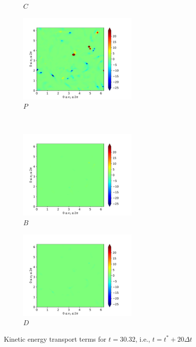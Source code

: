\begin{figure}[H]
\begin{subfigure}{0.45\textwidth}
        \caption{$C$}
    \end{subfigure}
    \newline
    \begin{subfigure}{0.45\textwidth}
        \includegraphics[height=1.75in]{media/run-cds-65/P-ke-1360}
        \caption{$P$}
    \end{subfigure}
    ~
    \begin{subfigure}{0.45\textwidth}
        \includegraphics[height=1.75in]{media/run-cds-65/B-ke-1360}
        \caption{$B$}
    \end{subfigure}
    \newline
    \begin{subfigure}{0.45\textwidth}
        \includegraphics[height=1.75in]{media/run-cds-65/D-ke-1360}
        \caption{$D$}
    \end{subfigure}
    \caption{Kinetic energy transport terms for $t=30.32$, i.e., $t=t^{\ast} + 20 \Delta t$}
\end{figure}
